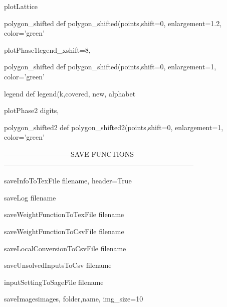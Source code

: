 \begin{method}{plotLattice}{}

\end{method}


\begin{method}{polygon\_shifted}{    def polygon\_shifted(points,shift=0, enlargement=1.2, color='green'}

\end{method}


\begin{method}{plotPhase1}{legend\_xshift=8,}

\end{method}


\begin{method}{polygon\_shifted}{    def polygon\_shifted(points,shift=0, enlargement=1, color='green'}

\end{method}


\begin{method}{legend}{    def legend(k,covered, new, alphabet}

\end{method}


\begin{method}{plotPhase2}{ digits,}

\end{method}


\begin{method}{polygon\_shifted2}{    def polygon\_shifted2(points,shift=0, enlargement=1, color='green'}

\end{method}


-----------------------------SAVE FUNCTIONS---------------------------------------------------------------------------------

\begin{method}{saveInfoToTexFile}{ filename, header=True}

\end{method}


\begin{method}{saveLog}{ filename}

\end{method}


\begin{method}{saveWeightFunctionToTexFile}{ filename}

\end{method}


\begin{method}{saveWeightFunctionToCsvFile}{ filename}

\end{method}


\begin{method}{saveLocalConversionToCsvFile}{ filename}

\end{method}


\begin{method}{saveUnsolvedInputsToCsv}{ filename}

\end{method}


\begin{method}{inputSettingToSageFile}{ filename}

\end{method}


\begin{method}{saveImages}{images, folder,name, img\_size=10}

\end{method}
